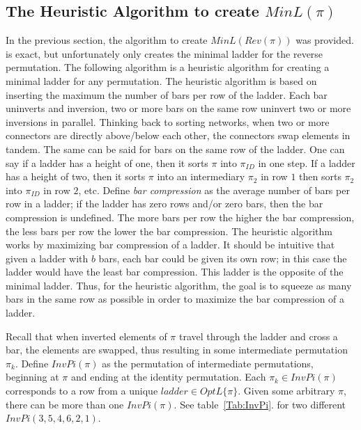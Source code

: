 \subsection{The Heuristic Algorithm to create $MinL(\pi)$}

In the previous section, the algorithm to create $MinL(Rev(\pi))$ was provided.
is exact, but unfortunately only creates the minimal ladder for the reverse permutation. The following algorithm 
is a heuristic algorithm for creating a minimal ladder for any permutation. The heuristic algorithm 
is based on inserting the maximum the number of bars per row of the ladder. Each bar uninverts and inversion, 
two or more bars on the same row uninvert two or more inversions in parallel. Thinking back to sorting networks, 
when two or more connectors are directly above/below each other, the connectors swap elements in tandem. The same 
can be said for bars on the same row of the ladder.
One can say if a ladder has a height of 
one, then it sorts $\pi$ into $\pi_{ID}$ in one step. If a ladder has a height of two, then it sorts $\pi$ into an intermediary $\pi_{2}$
in row $1$ then sorts $\pi_{2}$ into $\pi_{ID}$ in row $2$, etc.
Define \emph{bar compression} as the average number of bars per row in a ladder; if the ladder has zero rows and/or zero bars, then the 
bar compression is undefined. The more bars per row the higher the bar compression, the less bars per row the lower the bar compression. The heuristic algorithm 
works by maximizing bar compression of a ladder. It should be intuitive that given a ladder with $b$ bars, 
each bar could be given its own row; in this case the ladder would have the least bar compression. This ladder 
is the opposite of the minimal ladder. Thus, for the heuristic algorithm, the goal is to squeeze as many bars in the same row as possible in 
order to maximize the bar compression of a ladder.\par 
Recall that when inverted elements of $\pi$ travel through the ladder and cross a bar, the elements are swapped, thus resulting in 
some intermediate permutation $\pi_{k}$. Define $InvPi(\pi)$ as the permutation of intermediate permutations, beginning at $\pi$ and 
ending at the identity permutation. Each $\pi_{k} \in InvPi(\pi)$ corresponds to a row from a unique $ladder \in OptL\{\pi\}$. 
Given some arbitrary $\pi$, there can be more than one $InvPi(\pi)$. See table~\ref{Tab:InvPi}. 
for two different $InvPi(3,5,4,6,2,1)$.

